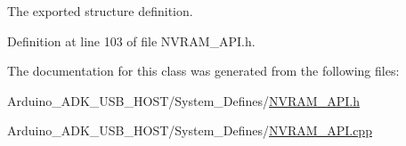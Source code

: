 The exported structure definition. 



Definition at line 103 of file N\-V\-R\-A\-M\-\_\-\-A\-P\-I.\-h.



The documentation for this class was generated from the following files\-:\begin{DoxyCompactItemize}
\item 
Arduino\-\_\-\-A\-D\-K\-\_\-\-U\-S\-B\-\_\-\-H\-O\-S\-T/\-System\-\_\-\-Defines/\hyperlink{_n_v_r_a_m___a_p_i_8h}{N\-V\-R\-A\-M\-\_\-\-A\-P\-I.\-h}\item 
Arduino\-\_\-\-A\-D\-K\-\_\-\-U\-S\-B\-\_\-\-H\-O\-S\-T/\-System\-\_\-\-Defines/\hyperlink{_n_v_r_a_m___a_p_i_8cpp}{N\-V\-R\-A\-M\-\_\-\-A\-P\-I.\-cpp}\end{DoxyCompactItemize}
